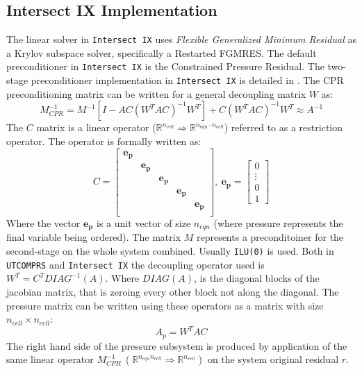 \subsection{Intersect IX Implementation}
The linear solver in \texttt{Intersect IX} uses \textit{Flexible Generalized Minimum Residual} as a Krylov subspace solver, specifically a Restarted FGMRES.  
The default preconditioner in \texttt{Intersect IX} is the Constrained Pressure Residual. The two-stage preconditioner implementation in \texttt{Intersect IX}
is detailed in \cite{ix-cpr,ix-tech}. The CPR preconditioning matrix can be written for a general decoupling matrix $W$ as:
\begin{equation}
	M_{CPR}^{-1} = M^{-1}[I - AC(W^{T}AC)^{-1}W^{T}] + C(W^{T}AC)^{-1}W^{T}\approx A^{-1}
\end{equation}
The $C$ matrix is a linear operator ($\mathbb{R}^{n_{cell}}\Rightarrow\mathbb{R}^{n_{eqn}\cdot n_{cell}}$) referred to as a restriction operator.
The operator is formally written as:
\begin{equation}
	C = \begin{bmatrix}
		\mathbf{e_{p}} & & & & \\
		      & \mathbf{e_{p}} & & &\\ 
		      &  & \mathbf{e_{p}}& &\\ 
		      &  & & \mathbf{e_{p}}&\\ 
		      &  & & &\mathbf{e_{p}}\\ 
	\end{bmatrix}, \ 
	\mathbf{e_{p}} = \begin{bmatrix}
		0\\
		\vdots\\
		0\\
		1
	\end{bmatrix}
	\label{cop}
\end{equation}
Where the vector $\mathbf{e_{p}}$ is a unit vector of size $n_{eqn}$ (where pressure represents the final variable being ordered).
The matrix $M$ represents a preconditoiner for the second-stage on the whole system combined. Usually \texttt{ILU(0)} is used.
Both in \texttt{UTCOMPRS} and \texttt{Intersect IX} the decoupling operator used is $W^{T} = C^{T}DIAG^{-1}(A)$. Where $DIAG(A)$,
is the diagonal blocks of the jacobian matrix, that is zeroing every other block not along the diagonal. The pressure matrix can be written
using these operators as a matrix with size $n_{cell}\times n_{cell}$:
\begin{equation}
	A_{p} = W^{T}AC
\end{equation}
The right hand side of the pressure subsystem is produced by application of the same linear operator $M_{CPR}^{-1} \ (\mathbb{R}^{n_{eqn}n_{cell}}\Rightarrow\mathbb{R}^{n_{cell}})$ 
on the system original residual $r$.

